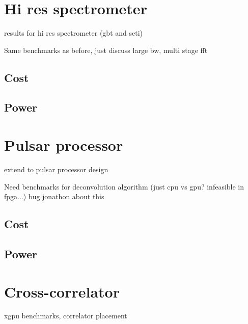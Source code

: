 \section{Hi res spectrometer}
results for hi res spectrometer (gbt and seti)

Same benchmarks as before, just discuss large bw, multi stage fft
\subsection{Cost}
\subsection{Power}

\section{Pulsar processor}
extend to pulsar processor design

Need benchmarks for deconvolution algorithm (just cpu vs gpu? infeasible in fpga...) bug jonathon about this
\subsection{Cost}
\subsection{Power}

\section{Cross-correlator}
xgpu benchmarks, correlator placement

